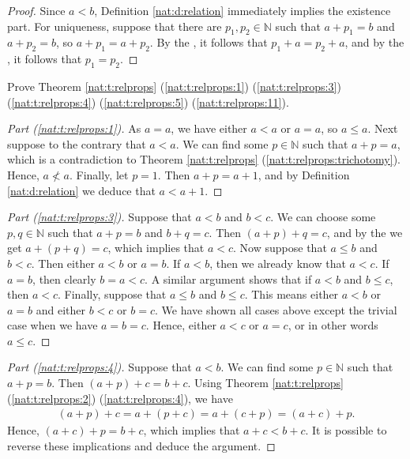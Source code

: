 \begin{proof}
	Since $a < b$, Definition \ref{nat:d:relation} immediately implies the existence part. For uniqueness, suppose that there are $p_{1}, p_{2} \in \mathbb{N}$ such that $a + p_{1} = b$ and $a + p_{2} = b$, so $a + p_{1} = a + p_{2}$. By the , it follows that $p_{1} + a = p_{2} + a$, and by the , it follows that $p_{1} = p_{2}$.
\end{proof}

\Newpage
\begin{exercise} %
	Prove Theorem \ref{nat:t:relprops} (\ref{nat:t:relprops:1}) (\ref{nat:t:relprops:3}) (\ref{nat:t:relprops:4}) (\ref{nat:t:relprops:5}) (\ref{nat:t:relprops:11}).
\end{exercise}

\begin{proof}[Part (\ref{nat:t:relprops:1})]
	As $a = a$, we have either $a < a$ or $a = a$, so $a \leq a$. Next suppose to the contrary that $a < a$. We can find some $p \in \mathbb{N}$ such that $a + p = a$, which is a contradiction to Theorem \ref{nat:t:relprops} (\ref{nat:t:relprops:trichotomy}). Hence, $a \nless a$. Finally, let $p = 1$. Then $a + p = a + 1$, and by Definition \ref{nat:d:relation} we deduce that $a < a + 1$.
\end{proof}

\begin{proof}[Part (\ref{nat:t:relprops:3})]
	Suppose that $a < b$ and $b < c$. We can choose some $p, q \in \mathbb{N}$ such that $a + p = b$ and $b + q = c$. Then $(a + p) + q = c$, and by the  we get $a + (p + q) = c$, which implies that $a < c$. Now suppose that $a \leq b$ and $b < c$. Then either $a < b$ or $a = b$. If $a < b$, then we already know that $a < c$. If $a = b$, then clearly $b = a < c$. A similar argument shows that if $a < b$ and $b \leq c$, then $a < c$. Finally, suppose that $a \leq b$ and $b \leq c$. This means either $a < b$ or $a = b$ and either $b < c$ or $b = c$. We have shown all cases above except the trivial case when we have $a = b = c$. Hence, either $a < c$ or $a = c$, or in other words $a \leq c$.
\end{proof}

\begin{proof}[Part (\ref{nat:t:relprops:4})]
	Suppose that $a < b$. We can find some $p \in \mathbb{N}$ such that $a + p = b$. Then $(a + p) + c = b + c$. Using Theorem \ref{nat:t:relprops} (\ref{nat:t:relprops:2}) (\ref{nat:t:relprops:4}), we have
	\begin{align*}
		(a + p) + c = a + (p + c) = a + (c + p) = (a + c) + p.
	\end{align*}
	Hence, $(a + c) + p = b + c$, which implies that $a + c < b + c$. It is possible to reverse these implications and deduce the argument.
\end{proof}

